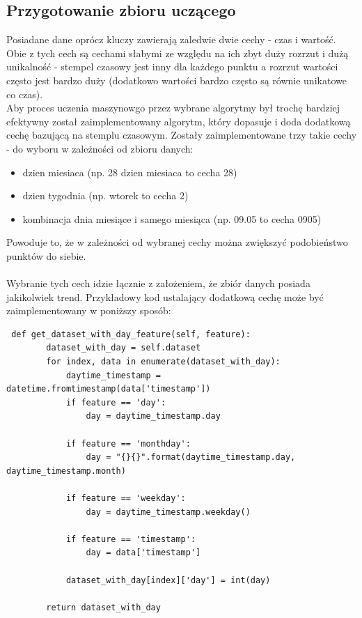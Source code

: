 \documentclass[eng,printmode]{mgr}
\begin{document}
\subsection{Przygotowanie zbioru uczącego}
Posiadane dane oprócz kluczy zawierają zaledwie dwie cechy - czas i wartość. Obie z tych cech są cechami słabymi ze względu na ich zbyt duży rozrzut i dużą unikalność - stempel czasowy jest inny dla każdego punktu a rozrzut wartości często jest bardzo duży (dodatkowo wartości bardzo często są równie unikatowe co czas). \\
Aby proces uczenia maszynowgo przez wybrane algorytmy był trochę bardziej efektywny został zaimplementowany algorytm, który dopasuje i doda dodatkową cechę bazującą na stemplu czasowym. Zostały zaimplementowane trzy takie cechy - do wyboru w zależności od zbioru danych:
\begin{itemize}
	\item dzien miesiaca (np. 28 dzien miesiaca to cecha 28)
	\item dzien tygodnia (np. wtorek to cecha 2)
	\item kombinacja dnia miesiące i samego miesiąca (np. 09.05 to cecha 0905)
\end{itemize}
Powoduje to, że w zależności od wybranej cechy można zwiększyć podobieństwo punktów do siebie. 
\\\\
Wybranie tych cech idzie łącznie z założeniem, że zbiór danych posiada jakikolwiek trend. Przykładowy kod ustalający dodatkową cechę może być zaimplementowany w poniższy sposób:
\\
\begin{lstlisting}
 def get_dataset_with_day_feature(self, feature):
        dataset_with_day = self.dataset
        for index, data in enumerate(dataset_with_day):
            daytime_timestamp = datetime.fromtimestamp(data['timestamp'])
            if feature == 'day':
                day = daytime_timestamp.day

            if feature == 'monthday':
                day = "{}{}".format(daytime_timestamp.day, daytime_timestamp.month)

            if feature == 'weekday':
                day = daytime_timestamp.weekday()

            if feature == 'timestamp':
                day = data['timestamp']

            dataset_with_day[index]['day'] = int(day)

        return dataset_with_day
\end{lstlisting}
\end{document}
